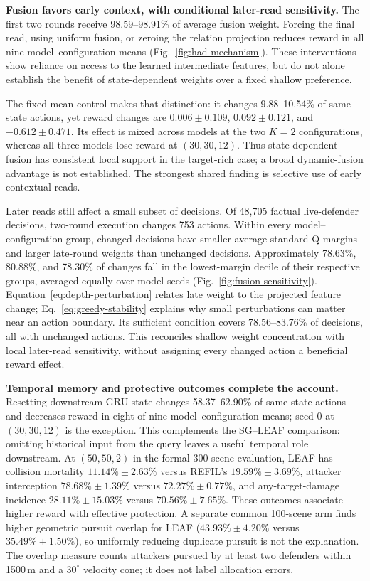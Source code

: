 \noindent\textbf{Fusion favors early context, with conditional later-read sensitivity.}
The first two rounds receive 98.59--98.91\% of average fusion weight. Forcing the final read, using uniform fusion, or zeroing the relation projection reduces reward in all nine model--configuration means (Fig.~\ref{fig:had-mechanism}). These interventions show reliance on access to the learned intermediate features, but do not alone establish the benefit of state-dependent weights over a fixed shallow preference.

The fixed mean control makes that distinction: it changes 9.88--10.54\% of same-state actions, yet reward changes are $0.006\pm0.109$, $0.092\pm0.121$, and $-0.612\pm0.471$. Its effect is mixed across models at the two $K=2$ configurations, whereas all three models lose reward at $(30,30,12)$. Thus state-dependent fusion has consistent local support in the target-rich case; a broad dynamic-fusion advantage is not established. The strongest shared finding is selective use of early contextual reads.

Later reads still affect a small subset of decisions. Of 48,705 factual live-defender decisions, two-round execution changes 753 actions. Within every model--configuration group, changed decisions have smaller average standard Q margins and larger late-round weights than unchanged decisions. Approximately 78.63\%, 80.88\%, and 78.30\% of changes fall in the lowest-margin decile of their respective groups, averaged equally over model seeds (Fig.~\ref{fig:fusion-sensitivity}). Equation~\eqref{eq:depth-perturbation} relates late weight to the projected feature change; Eq.~\eqref{eq:greedy-stability} explains why small perturbations can matter near an action boundary. Its sufficient condition covers 78.56--83.76\% of decisions, all with unchanged actions. This reconciles shallow weight concentration with local later-read sensitivity, without assigning every changed action a beneficial reward effect.

\noindent\textbf{Temporal memory and protective outcomes complete the account.}
Resetting downstream GRU state changes 58.37--62.90\% of same-state actions and decreases reward in eight of nine model--configuration means; seed 0 at $(30,30,12)$ is the exception. This complements the SG--LEAF comparison: omitting historical input from the query leaves a useful temporal role downstream. At $(50,50,2)$ in the formal 300-scene evaluation, LEAF has collision mortality $11.14\%\pm2.63\%$ versus REFIL's $19.59\%\pm3.69\%$, attacker interception $78.68\%\pm1.39\%$ versus $72.27\%\pm0.77\%$, and any-target-damage incidence $28.11\%\pm15.03\%$ versus $70.56\%\pm7.65\%$. These outcomes associate higher reward with effective protection. A separate common 100-scene arm finds higher geometric pursuit overlap for LEAF ($43.93\%\pm4.20\%$ versus $35.49\%\pm1.50\%$), so uniformly reducing duplicate pursuit is not the explanation. The overlap measure counts attackers pursued by at least two defenders within 1500\,m and a $30^\circ$ velocity cone; it does not label allocation errors.


